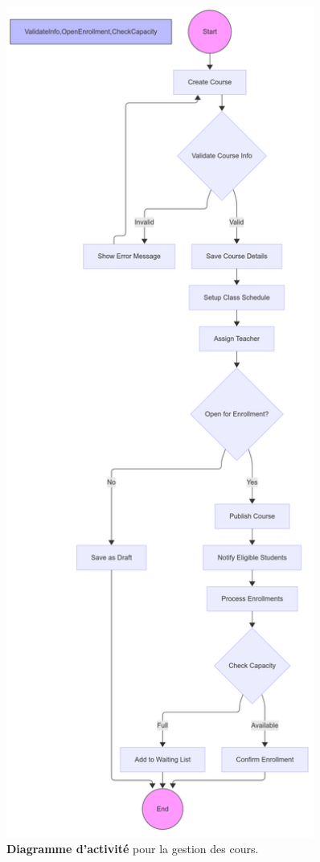\begin{figure}[H]
  \centering
  \includegraphics[width=0.9\textwidth,keepaspectratio]{pfe-pics/diagrames/Activity Diagram (for Course Management).png}
  \caption{\textbf{Diagramme d'activité} pour la gestion des cours.}
  \label{fig:course_management}
\end{figure}

